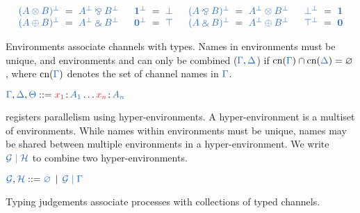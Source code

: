 \documentclass[envcountsame,envcountsect,UKenglish]{llncs}
\begin{document}
\begin{definition}[Duality]\label{def:cp-negation}
  \[
    \setlength{\arraycolsep}{3pt}
    \begin{array}{lclclcllclclcl}
              \ty{(A \tens B)^\bot} &=& \ty{A^\bot \parr B^\bot}
      &\quad \ty{\one^\bot}        &=& \ty{\bot}
      &\quad \ty{(A \parr B)^\bot} &=& \ty{A^\bot \tens B^\bot}
      &\quad \ty{\bot^\bot}        &=& \ty{\one}
      \\      \ty{(A \plus B)^\bot} &=& \ty{A^\bot \with B^\bot}
      &\quad \ty{\nil^\bot}        &=& \ty{\top}
      &\quad \ty{(A \with B)^\bot} &=& \ty{A^\bot \plus B^\bot}
      &\quad \ty{\top^\bot}        &=& \ty{\nil}
    \end{array}
  \]
\end{definition}
Environments associate channels with types. Names in environments must be unique, and environments \ty{\Gamma} and \ty{\Delta} can only be combined ($\ty{\Gamma}, \ty{\Delta}$) if $\text{cn}(\ty{\Gamma}) \cap \text{cn}(\ty{\Delta}) = \varnothing$, where $\text{cn}{(\ty{\Gamma})}$ denotes the set of channel names in $\ty{\Gamma}$. 
\begin{definition}[Environments]\label{def:cp-environments}
  $\ty{\Gamma}, \ty{\Delta}, \ty{\Theta} ::= \tmty{x_1}{A_1}\dots\tmty{x_n}{A_n}$
\end{definition}
\hcp registers parallelism using hyper-environments. A hyper-environment is a multiset of environments. While names within environments must be unique, names may be shared between multiple environments in a hyper-environment. We write $\ty{\mathcal{G} \hsep \mathcal{H}}$ to combine two hyper-environments.
\begin{definition}\label{def:hcp-hyper-environment}
  $\ty{\mathcal{G}}, \ty{\mathcal{H}} ::= \ty{\emptyhypercontext} \, \mid \, \ty{\mathcal{G} \hsep \Gamma}$
\end{definition}
Typing judgements associate processes with collections of typed channels.
\end{document}
